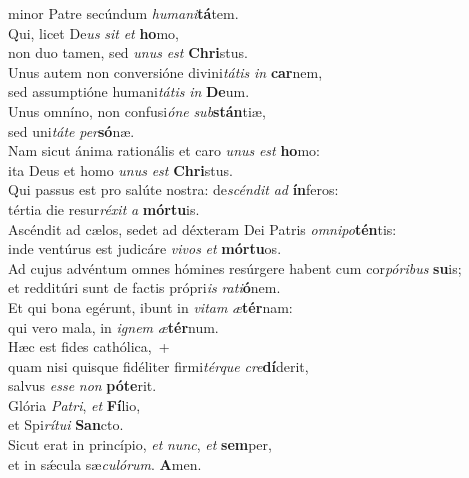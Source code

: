 \oddverse minor Patre secúndum \textit{hu}\textit{ma}\textit{ni}\textbf{tá}tem.\\
\evenverse Qui, licet De\textit{us} \textit{sit} \textit{et} \textbf{ho}mo,~\*\\
\evenverse non duo tamen, sed \textit{u}\textit{nus} \textit{est} \textbf{Chri}stus.\\
\oddverse Unus autem non conversióne divini\textit{tá}\textit{tis} \textit{in} \textbf{car}nem,~\*\\
\oddverse sed assumptióne humani\textit{tá}\textit{tis} \textit{in} \textbf{De}um.\\
\evenverse Unus omníno, non confusi\textit{ó}\textit{ne} \textit{sub}\textbf{stán}tiæ,~\*\\
\evenverse sed uni\textit{tá}\textit{te} \textit{per}\textbf{só}næ.\\
\oddverse Nam sicut ánima rationális et caro \textit{u}\textit{nus} \textit{est} \textbf{ho}mo:~\*\\
\oddverse ita Deus et homo \textit{u}\textit{nus} \textit{est} \textbf{Chri}stus.\\
\evenverse Qui passus est pro salúte nostra: de\textit{scén}\textit{dit} \textit{ad} \textbf{ín}feros:~\*\\
\evenverse tértia die resur\textit{ré}\textit{xit} \textit{a} \textbf{mór}\textbf{tu}is.\\
\oddverse Ascéndit ad cælos, sedet ad déxteram Dei Patris \textit{om}\textit{ni}\textit{po}\textbf{tén}tis:~\*\\
\oddverse inde ventúrus est judicáre \textit{vi}\textit{vos} \textit{et} \textbf{mór}\textbf{tu}os.\\
\evenverse Ad cujus advéntum omnes hómines resúrgere habent cum cor\textit{pó}\textit{ri}\textit{bus} \textbf{su}is;~\*\\
\evenverse et redditúri sunt de factis própri\textit{is} \textit{ra}\textit{ti}\textbf{ó}nem.\\
\oddverse Et qui bona egérunt, ibunt in \textit{vi}\textit{tam} \textit{æ}\textbf{tér}nam:~\*\\
\oddverse qui vero mala, in \textit{i}\textit{gnem} \textit{æ}\textbf{tér}num.\\
\evenverse Hæc est fides cathólica,~+\\
\evenverse  quam nisi quisque fidéliter firmi\textit{tér}\textit{que} \textit{cre}\textbf{dí}derit,~\*\\
\evenverse salvus \textit{es}\textit{se} \textit{non} \textbf{pó}\textbf{te}rit.\\
\oddverse Glória \textit{Pa}\textit{tri}, \textit{et} \textbf{Fí}lio,~\*\\
\oddverse et Spi\textit{rí}\textit{tu}\textit{i} \textbf{San}cto.\\
\evenverse Sicut erat in princípio, \textit{et} \textit{nunc}, \textit{et} \textbf{sem}per,~\*\\
\evenverse et in sǽcula sæ\textit{cu}\textit{ló}\textit{rum}. \textbf{A}men.\\
